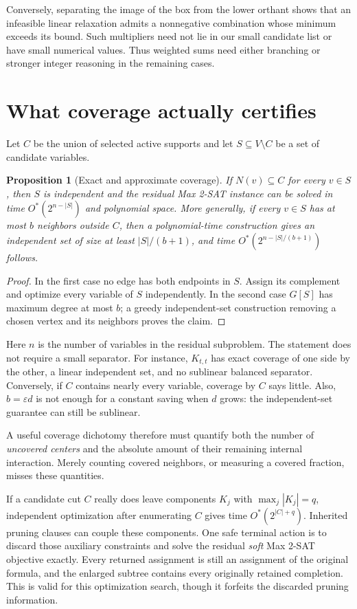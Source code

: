 \documentclass[11pt,a4paper]{article}
\newtheorem{proposition}{Proposition}
\theoremstyle{remark}
\newcommand{\Ostar}{O^{*}}
\begin{document}
Conversely, separating the image of the box from the lower orthant shows
that an infeasible linear relaxation admits a nonnegative combination whose
minimum exceeds its bound. Such multipliers need not lie in our small
candidate list or have small numerical values. Thus weighted sums need
either branching or stronger integer reasoning in the remaining cases.

\section{What coverage actually certifies}

Let $C$ be the union of selected active supports and let
$S\subseteq V\setminus C$ be a set of candidate variables.

\begin{proposition}[Exact and approximate coverage]
If $N(v)\subseteq C$ for every $v\in S$, then $S$ is independent and the
residual Max 2-SAT instance can be solved in time $\Ostar(2^{n-|S|})$ and
polynomial space. More generally, if every $v\in S$ has at most $b$ neighbors
outside $C$, then a polynomial-time construction gives an independent set
of size at least $|S|/(b+1)$, and time
$\Ostar(2^{n-|S|/(b+1)})$ follows.
\end{proposition}
\begin{proof}
In the first case no edge has both endpoints in $S$. Assign its complement
and optimize every variable of $S$ independently. In the second case
$G[S]$ has maximum degree at most $b$; a greedy independent-set construction
removing a chosen vertex and its neighbors proves the claim.
\end{proof}

Here $n$ is the number of variables in the residual subproblem. The statement
does not require a small separator. For instance, $K_{t,t}$ has exact
coverage of one side by the other, a linear independent set, and no
sublinear balanced separator. Conversely, if $C$ contains nearly every
variable, coverage by $C$ says little. Also, $b=\varepsilon d$ is not enough
for a constant saving when $d$ grows: the independent-set guarantee can
still be sublinear.

A useful coverage dichotomy therefore must quantify both the number of
\emph{uncovered centers} and the absolute amount of their remaining internal
interaction. Merely counting covered neighbors, or measuring a covered
fraction, misses these quantities.

If a candidate cut $C$ really does leave components $K_j$ with
$\max_j|K_j|=q$, independent optimization after enumerating $C$ gives time
$\Ostar(2^{|C|+q})$. Inherited pruning clauses can couple these components.
One safe terminal action is to discard those auxiliary constraints and solve
the residual \emph{soft} Max 2-SAT objective exactly. Every returned assignment
is still an assignment of the original formula, and the enlarged subtree
contains every originally retained completion. This is valid for this
optimization search, though it forfeits the discarded pruning information.
\end{document}
